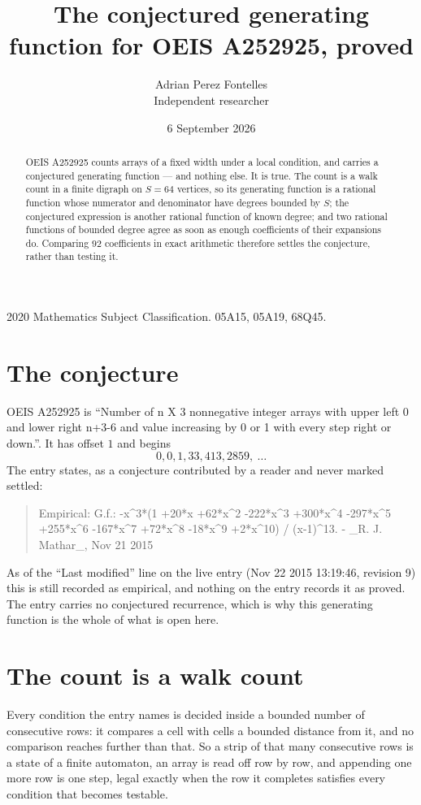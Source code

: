 \documentclass[11pt,a4paper]{article}
\title{The conjectured generating function for OEIS A252925, proved}
\author{Adrian Perez Fontelles\\ \small Independent researcher}
\date{6 September 2026}
\theoremstyle{plain}
\theoremstyle{definition}
\begin{document}
\maketitle

\begin{abstract}
OEIS A252925 counts arrays of a fixed width under a local condition, and carries a conjectured
generating function --- and nothing else. It is true. The count is a walk count in a finite
digraph on $S=64$ vertices, so its generating function is a rational function whose numerator
and denominator have degrees bounded by $S$; the conjectured expression is another rational
function of known degree; and two rational functions of bounded degree agree as soon as enough
coefficients of their expansions do. Comparing $92$ coefficients in exact arithmetic
therefore settles the conjecture, rather than testing it.
\end{abstract}

\noindent\small 2020 Mathematics Subject Classification. 05A15, 05A19, 68Q45.\normalsize

\section{The conjecture}

OEIS A252925 is ``Number of n X 3 nonnegative integer arrays with upper left 0 and lower right n+3-6 and value increasing by 0 or 1 with every step right or down.''. It has offset $1$ and begins
\[
0, 0, 1, 33, 413, 2859,\ \dots
\]
The entry states, as a conjecture contributed by a reader and never marked settled:
\begin{quote}
Empirical: G.f.:  -x\^{}3*(1 +20*x +62*x\^{}2 -222*x\^{}3 +300*x\^{}4 -297*x\^{}5 +255*x\^{}6 -167*x\^{}7 +72*x\^{}8 -18*x\^{}9 +2*x\^{}10) / (x-1)\^{}13. - \_R. J. Mathar\_, Nov 21 2015
\end{quote}
As of the ``Last modified'' line on the live entry (Nov 22 2015 13:19:46, revision 9) this is still
recorded as empirical, and nothing on the entry records it as proved. The entry carries no
conjectured recurrence, which is why this generating function is the whole of what is open
here.

\section{The count is a walk count}

Every condition the entry names is decided inside a bounded number of consecutive rows: it
compares a cell with cells a bounded distance from it, and no comparison reaches further than
that. So a strip of that many consecutive rows is a state of a finite automaton, an array is
read off row by row, and appending one more row is one step, legal exactly when the row it
completes satisfies every condition that becomes testable.
\end{document}

